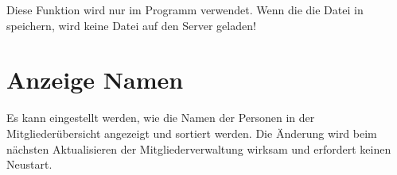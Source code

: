 \begin{hinweis}
  Diese Funktion wird nur im Programm \Einsatz verwendet.
  Wenn die die Datei in \Personal speichern, wird keine Datei auf den Server geladen!
\end{hinweis}


\section{Anzeige Namen}
Es kann eingestellt werden, wie die Namen der Personen in der Mitgliederübersicht angezeigt und sortiert werden.
Die Änderung wird beim nächsten Aktualisieren der Mitgliederverwaltung wirksam und erfordert keinen Neustart.
